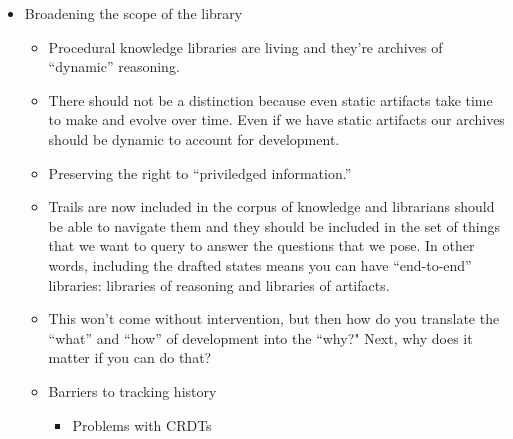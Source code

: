 \documentclass[
]{article}
\begin{document}
\begin{itemize}
\item
  Broadening the scope of the library

  \begin{itemize}
  \item
    Procedural knowledge libraries are living and they're archives of
    ``dynamic'' reasoning.
  \item
    There should not be a distinction because even static artifacts take
    time to make and evolve over time. {Even if we have static artifacts
    our archives should be dynamic to account for development.}
  \item
    Preserving the right to ``priviledged information.''
  \item
    Trails are now included in the corpus of knowledge and librarians
    should be able to navigate them and they should be included in the
    set of things that we want to query to answer the questions that we
    pose. In other words, including the drafted states means you can
    have ``end-to-end'' libraries: libraries of reasoning and libraries
    of artifacts.
  \item
    This won't come without intervention, but then how do you translate
    the ``what'' and ``how'' of development into the ``why?" Next, why
    does it matter if you can do that?
  \item
    Barriers to tracking history

    \begin{itemize}
    \item
      Problems with CRDTs


\end{itemize}
\end{itemize}
\end{itemize}
\end{document}
